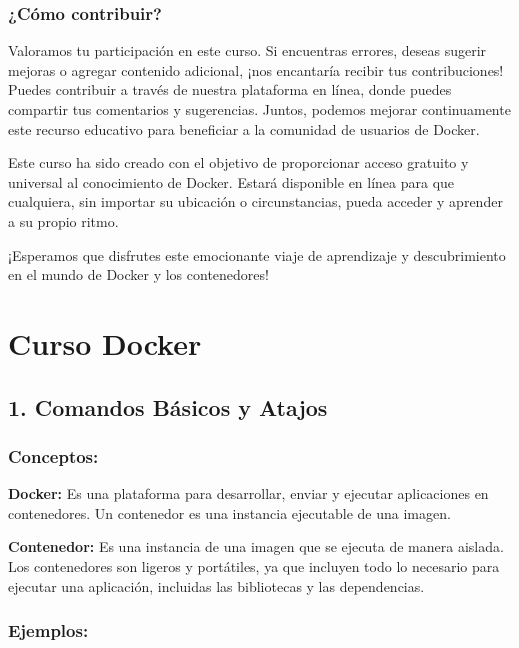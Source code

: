 \documentclass[
  a4paper,
  DIV=11,
  numbers=noendperiod,
  onepage,
  openany]{scrreprt}
\begin{document}
\hypertarget{cuxf3mo-contribuir}{%
\section{¿Cómo contribuir?}\label{cuxf3mo-contribuir}}

Valoramos tu participación en este curso. Si encuentras errores, deseas
sugerir mejoras o agregar contenido adicional, ¡nos encantaría recibir
tus contribuciones! Puedes contribuir a través de nuestra plataforma en
línea, donde puedes compartir tus comentarios y sugerencias. Juntos,
podemos mejorar continuamente este recurso educativo para beneficiar a
la comunidad de usuarios de Docker.

Este curso ha sido creado con el objetivo de proporcionar acceso
gratuito y universal al conocimiento de Docker. Estará disponible en
línea para que cualquiera, sin importar su ubicación o circunstancias,
pueda acceder y aprender a su propio ritmo.

¡Esperamos que disfrutes este emocionante viaje de aprendizaje y
descubrimiento en el mundo de Docker y los contenedores!

\part{Curso Docker}

\hypertarget{comandos-buxe1sicos-y-atajos}{%
\chapter{1. Comandos Básicos y
Atajos}\label{comandos-buxe1sicos-y-atajos}}

\hypertarget{conceptos}{%
\section{Conceptos:}\label{conceptos}}

\textbf{Docker:} Es una plataforma para desarrollar, enviar y ejecutar
aplicaciones en contenedores. Un contenedor es una instancia ejecutable
de una imagen.

\textbf{Contenedor:} Es una instancia de una imagen que se ejecuta de
manera aislada. Los contenedores son ligeros y portátiles, ya que
incluyen todo lo necesario para ejecutar una aplicación, incluidas las
bibliotecas y las dependencias.

\hypertarget{ejemplos}{%
\section{Ejemplos:}\label{ejemplos}}
\end{document}
